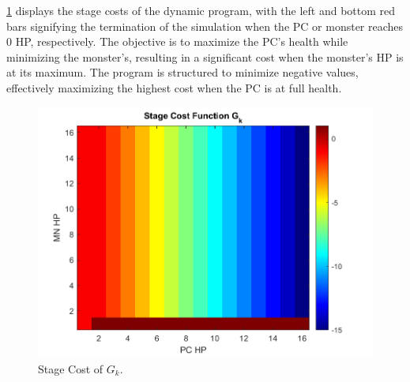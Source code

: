 \documentclass[letterpaper, 10 pt, conference]{ieeeconf}
\begin{document}
\cref{fig:G_k_vis} displays the stage costs of the dynamic program, with the left and bottom red bars signifying the termination of the simulation when the PC or monster reaches 0 HP, respectively. The objective is to maximize the PC's health while minimizing the monster's, resulting in a significant cost when the monster's HP is at its maximum. 
The program is structured to minimize negative values, effectively maximizing the highest cost when the PC is at full health.



\begin{figure}[thb]
    \centering
    \includegraphics[scale =0.44]{figs/DND_StageCost_G_k.png}
    \caption{Stage Cost of $G_k$.}
    \label{fig:G_k_vis}
\end{figure}




{}

\end{document}
